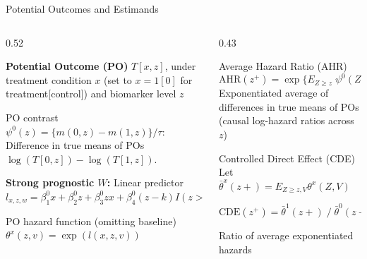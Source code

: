 \documentclass[
  ignorenonframetext,
  aspectratio=169]{beamer}
\begin{document}
\begin{frame}[shrink]{Potential Outcomes and Estimands}
\label{potential-outcomes-and-estimands}
\begin{columns}[T]
\begin{column}{0.52\textwidth}

\textbf{Potential Outcome (PO)} $T[x,z]$, under treatment condition $x$ (set to $x=1[0]$ for treatment[control]) and biomarker level $z$


\begin{alertblock}{PO contrast} $\psi^{0}(z) = \{m(0,z) - m(1,z)\}/\tau$: Difference in true means of POs $\log(T[0,z]) - \log(T[1,z])$.
\end{alertblock}

\textbf{Strong prognostic $W$:} Linear predictor $l_{x,z,w} = \beta_{1}^{0}x + \beta_{2}^{0}z + \beta_{3}^{0}zx + \beta_{4}^{0}(z-k)I(z>k) + \beta_{5}^{0}(z-k)I(z>k)x + \beta_{w}^{0}w$

\begin{alertblock}{PO hazard function (omitting baseline)}
$\theta^{x}(z,v) = \exp(l(x,z,v))$
\end{alertblock}

\end{column}
\begin{column}{0.43\textwidth}

\begin{alertblock}{Average Hazard Ratio (AHR)}
$$\text{AHR}(z^{+}) = \exp\!\bigl\{E_{Z \geq z}\;\psi^{0}(Z)\bigr\}$$
Exponentiated average of differences in true means of POs (causal log-hazard ratios across $z$)
\end{alertblock}

\begin{alertblock}{Controlled Direct Effect (CDE)}
 Let $\bar{\theta}^{x}(z+) = E_{Z \geq z,V}\theta^{x}(Z,V)$


$$\text{CDE}(z^{+}) = \bar{\theta}^{1}(z+)\;/\;\bar{\theta}^{0}(z+)$$

Ratio of average exponentiated hazards
\end{alertblock}

\end{column}
\end{columns}
\end{frame}
\end{document}
